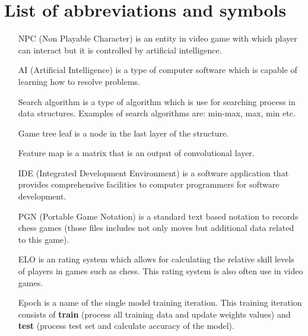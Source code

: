 \chapter{List of abbreviations and symbols}

\begin{itemize}
    \item[NPC] (Non Playable Character) is an entity in video game with which player can interact but it is controlled by artificial intelligence.
    \item[AI] (Artificial Intelligence) is a type of computer software which is capable of learning how to resolve problems.
    \item[Search algorithm] is a type of algorithm which is use for searching process in data structures. Examples of search algorithms are: min-max, max, min etc.
    \item[Game tree leaf] is a node in the last layer of the structure.
    \item[Feature map] is a matrix that is an output of convolutional layer. 
    \item[IDE] (Integrated Development Environment) is a software application that provides comprehensive facilities to computer programmers for software development.
    \item[PGN] (Portable Game Notation) is a standard text based notation to records chess games (those files includes not only moves but additional data related to this game).
    \item[ELO] is an rating system which allows for calculating the relative skill levels of players in games such as chess. This rating system is also often use in video games.
    \item[Epoch] is a name of the single model training iteration. This training iteration consists of \textbf{train} (process all training data and update weights values) and \textbf{test} (process test set and calculate accuracy of the model).
\end{itemize}
